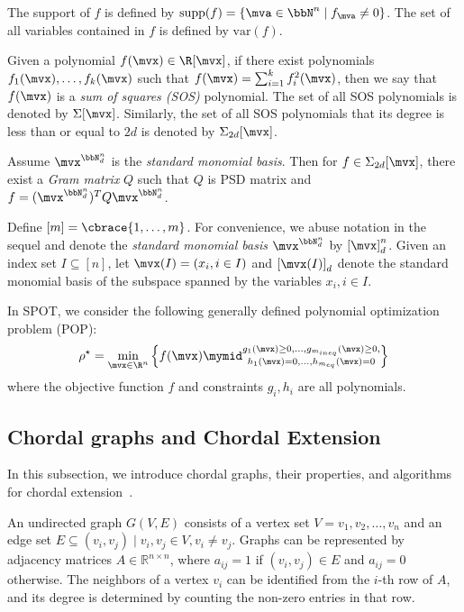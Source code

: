 The support of $f$ is defined by $\text{supp}(f) = \left\{ \mva\in \bbN^n\mid f_\mva \ne 0 \right\}$. The set of all variables contained in $f$ is defined by $\text{var}(f)$.

Given a polynomial $f(\mvx)\in \R[\mvx]$, if there exist polynomials $f_1(\mvx), \dots, f_k(\mvx)$ such that $f(\mvx) = \sum_{i=1}^k f_i^2(\mvx)$, then we say that $f(\mvx)$ is a \emph{sum of squares (SOS)} polynomial. The set of all SOS polynomials is denoted by $\Sigma[\mvx]$. Similarly, the set of all SOS polynomials that its degree is less than or equal to $2d$ is denoted by $\Sigma_{2d}[\mvx]$. 

Assume $\mvx^{\bbN_d^n}$ is the \emph{standard monomial basis}. Then for $f\in \Sigma_{2d}[\mvx]$, there exist a \emph{Gram matrix} $Q$ such that $Q$ is PSD matrix and $f = (\mvx^{\bbN_d^n})^T Q \mvx^{\bbN_d^n}$. 

Define $[m] = \cbrace{1,\dots,m}$. For convenience, we abuse notation in the sequel and denote the \emph{standard monomial basis} $\mvx^{\bbN_d^n}$ by ${[\mvx]}^n_d$. Given an index set $I\subseteq [n]$, let $\mvx(I)= (x_i, i\in I)$ and ${[\mvx(I)]}_d$ denote the standard monomial basis of the subspace spanned by the variables $x_i, i\in I$.


In SPOT, we consider the following generally defined polynomial optimization problem (POP):
\begin{equation}
	\rho^\star = \min_{\mvx\in \R^n}\left\{
        f(\mvx)\mymid 
        \substack{g_1(\mvx)\ge 0, \dots, g_{m_{ineq}}(\mvx)\ge 0,\\
        h_1(\mvx) = 0, \dots, h_{m_{eq}}(\mvx) = 0}
    \right\} 
\end{equation}
where the objective function $f$ and constraints $g_i, h_i$ are all polynomials.





\subsection{Chordal graphs and Chordal Extension}



In this subsection, we introduce chordal graphs, their properties, and algorithms for chordal extension~\cite{Blair1993book-chordal-clique}.

An undirected graph $G(V, E)$ consists of a vertex set $V={v_1, v_2, \dots, v_n}$ and an edge set $E \subseteq {(v_i, v_j) \mid v_i, v_j\in V, v_i\ne v_j }$. Graphs can be represented by adjacency matrices $A \in \mathbb{R}^{n \times n}$, where $a_{ij} = 1$ if $(v_i, v_j) \in E$ and $a_{ij} = 0$ otherwise. The neighbors of a vertex $v_i$ can be identified from the $i$-th row of $A$, and its degree is determined by counting the non-zero entries in that row.

